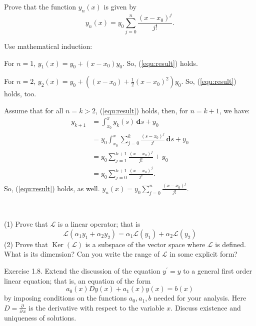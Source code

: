 \documentclass[en, normal, 12pt, black]{elegantnote}
\newenvironment{exercise}[1]{\begin{tcolorbox}[colback=black!15, colframe=black!80, breakable, title=#1]}{\end{tcolorbox}}
\renewenvironment{proof}{\begin{tcolorbox}[colback=white, colframe=black!50, breakable, title=Proof. ]\setlength{\parskip}{0.8em}}{\,\\\rightline{$\square$}\end{tcolorbox}}
\newcommand{\pder}{\partial\,}
\newcommand{\der}{\,\mathbf{d}}
\begin{document}
    \begin{exercise}{1.6.}
        Prove that the function $y_n(x)$ is given by
        \begin{equation}
            \label{equ:result}
            y_{n}(x)=y_{0} \sum_{j=0}^{n} \frac{\left(x-x_{0}\right)^{j}}{j !}.
        \end{equation}
    \end{exercise}
    \begin{proof}
        Use mathematical induction: 

        For \(n=1\), \(y_1(x)=y_0+(x-x_0)y_0\). So, (\ref{equ:result}) holds. 

        For \(n=2\), \(y_2(x)=y_0+\left((x-x_0)+\frac{1}{2}(x-x_0)^2\right)y_0\). So, (\ref{equ:result}) holds, too. 

        Assume that for all \(n=k>2\), (\ref{equ:result}) holds, then, for \(n=k+1\), we have: 
        \begin{align*}
            y_{k+1}&=\int_{x_0}^xy_k(s)\der s + y_0\\
            &=y_0\int_{x_0}^x\sum_{j=0}^{k} \frac{\left(s-x_{0}\right)^{j}}{j !}\der s + y_0\\
            &=y_0\sum_{j=1}^{k+1} \frac{\left(x-x_{0}\right)^{j}}{j !}+y_0\\
            &=y_0\sum_{j=0}^{k+1} \frac{\left(x-x_{0}\right)^{j}}{j !}. 
        \end{align*}
        So, (\ref{equ:result}) holds, as well. \( y_{n}(x)=y_{0} \sum_{j=0}^{n} \frac{\left(x-x_{0}\right)^{j}}{j !}\). 

    \end{proof}

    \begin{exercise}{1.7.}
            (1) Prove that \(\mathcal{L}\) is a linear operator; that is 
            \[\mathcal{L}\left(\alpha_{1} y_{1}+\alpha_{2} y_{2}\right)=\alpha_{1} \mathcal{L}\left(y_{1}\right)+\alpha_{2} \mathcal{L}\left(y_{2}\right)\]
            (2) Prove that $\operatorname{Ker}(\mathcal{L})$ is a subspace of the vector space where $\mathcal{L}$ is defined. What is its dimension? Can you write the range of $\mathcal{L}$ in some explicit form? 
    \end{exercise}

    \begin{exercise}{1.18.}
        Exercise 1.8. Extend the discussion of the equation $y^{\prime}=y$ to a general first order linear equation; that is, an equation of the form
        \[
            a_{0}(x) D y(x)+a_{1}(x) y(x)=b(x)
        \]
        by imposing conditions on the functions \(a_{0}, a_{1}, b\) needed for your analysis. Here \(D=\frac{\pder}{\pder x}\) is the derivative with respect to the variable \(x\). Discuss existence and uniqueness of solutions.
    \end{exercise}
\end{document}
